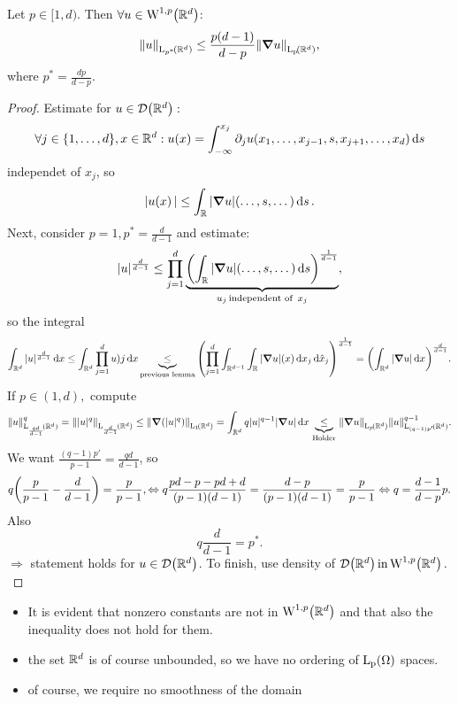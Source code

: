 \documentclass{article}
\begin{document}
\begin{theorem}
	Let $p \in [1,d).$ Then $\forall u \in \WkpSet[1][p]{\R^d}$:
	\[
		\norm{u}_{\LpSet[p^{*}]{\R^d}}\leq \frac{p(d-1)}{d-p} \norm{\grad u}_{\LpSet{\R^d}}, 
	\]
	where $p^{*}=\frac{dp}{d-p}.$
\end{theorem}

\begin{proof}
	Estimate for $u \in \mathcal{D}\qty({\mathbb R}^d):$
	\[
		\forall j \in \{1,\dots,d\}, x \in {\mathbb R}^d: u\qty(x)=\int_{-\infty}^{x_j}\partial_{j}u\qty(x_1,\dots,x_{j-1},s,x_{j+1},\dots,x_d)\dd{s}
	\]
	independet of $x_j$, so
	\[
		|u\qty(x)| \leq \int_{{\mathbb R}}|\grad u|\qty(\dots,s,\dots)\dd{s}.
	\]
	Next, consider $p=1, p^{*}=\frac{d}{d-1}$ and estimate:
	\[
		|u|^{\frac{d}{d-1}}\leq\prod_{j=1}^d\underbrace{\qty(\int_{{\mathbb R}}|\grad u| (\dots, s, \dots) \dd{s})^{\frac{1}{d-1}}}_{u_j \, \text{independent of } \,x_j},
	\]
	so the integral
	\[
		\int_{{\mathbb R}^d}|u|^{\frac{d}{d-1}}\dd{x} \leq \int_{{\mathbb R}^d}\prod_{j=1}^d u)j \dd{x} \underbrace{\leq}_{\text{previous lemma}} \qty(\prod_{j=1}^d \int_{{\mathbb R}^{d-1}}\int_{{\mathbb R}}|\grad u|\qty(x)\dd{x_j}\dd{\hat{x}_j})^{\frac{1}{d-1}} = \qty(\int_{{\mathbb R}^d}|\grad u|\dd{x})^{\frac{d}{d-1}}.
	\]
	If $p \in (1,d),$ compute
	\[
		\norm{u}_{\LpSet[\frac{qd}{d-1}]{\R^d}}^q = \norm{|u|^q}_{\LpSet[\frac{d}{d-1}]{\R^d}} \leq \norm{\grad (|u|^q)}_{\LpSet[1]{\R^d}} = \int_{\R^d}q|u|^{q-1} |\grad u| \dd{x} \underbrace{\leq}_{\, \text{Holder} \,} \norm{\grad u}_{\LpSet[p]{\R^d}} \norm{u}_{\LpSet[(q-1)p']{\R^d}}^{q-1}.
	\] We want $\frac{(q-1)p'}{p-1} = \frac{qd}{d-1}$, so
	\[
		q \qty(\frac{p}{p-1} - \frac{d}{d-1}) = \frac{p}{p-1}, \Leftrightarrow q\frac{pd-p-pd+d}{(p-1)(d-1)}=\frac{d-p}{\qty(p-1)\qty(d-1)}=\frac{p}{p-1} \Leftrightarrow q=\frac{d-1}{d-p}p.
	\]
	Also
	\[
		q \frac{d}{d-1}=p^{*}.
	\]
	$\Rightarrow$ statement holds for $u \in \mathcal{D}\qty({\mathbb R}^d)$. To finish, use density of $\mathcal{D}\qty(\R^d) \, \text{in} \, \WkpSet[1][p]{\R^d}.$
\end{proof}


\begin{remark}

	\begin{itemize}
		\item It is evident that nonzero constants are not in $\WkpSet[1][p]{\R^d}$ and that also the inequality does not hold for them.
		\item the set ${\mathbb R}^d$ is of course unbounded, so we have no ordering of $\LpSet{\Omega}$ spaces.
		\item of course, we require no smoothness of the domain
	\end{itemize}


\end{remark}
\end{document}
